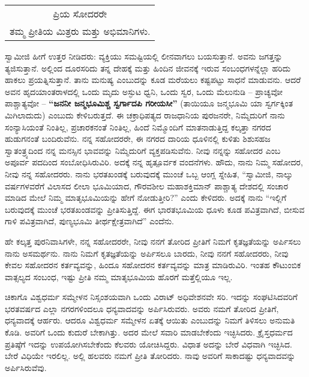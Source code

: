 \begin{longtable}[r]{@{}c@{}}
ಪ್ರಿಯ ಸೋದರರೇ \\
ತಮ್ಮ ಪ್ರೀತಿಯ ಮಿತ್ರರು ಮತ್ತು ಅಭಿಮಾನಿಗಳು. \\
\end{longtable}

\vskip 0.2cm

ಸ್ವಾಮೀಜಿ ಹೀಗೆ ಉತ್ತರ ನೀಡಿದರು: ವ್ಯಕ್ತಿಯು ಸಮಷ್ಟಿಯಲ್ಲಿ ಲೀನವಾಗಲು ಬಯಸುತ್ತಾನೆ. ಅವನು ಜಗತ್ತನ್ನು ತ್ಯಜಿಸುತ್ತಾನೆ. ಅಲ್ಲಿಂದ ದೂರಸರಿದು ತನ್ನ ದೇಹಕ್ಕೆ ಮತ್ತು ಹಿಂದಿನ ಜೀವನಕ್ಕೆ ಇರುವ ಸಂಬಂಧಗಳನ್ನೆಲ್ಲಾ ಹರಿದು ಹಾಕಲು ಪ್ರಯತ್ನಿಸುತ್ತಾನೆ. ತಾನು ಮನುಷ್ಯ ಎಂಬುದನ್ನು ಕೂಡ ಮರೆಯಲು ಕಷ್ಟಪಟ್ಟು ಸಾಧನೆ ಮಾಡುವನು. ಆದರೆ ಅವನ ಹೃದಯಾಂತರಾಳದಲ್ಲಿ ಒಂದು ಮೃದು ಅಸ್ಫುಟ ಧ್ವನಿ, ಒಂದು ಸ್ವರ, ಒಂದು ಮೆಲುನುಡಿ – ಪ್ರಾಚ್ಯವೋ ಪಾಶ್ಚಾತ್ಯವೋ – \textbf{“ಜನನೀ ಜನ್ಮಭೂಮಿಶ್ಚ ಸ್ವರ್ಗಾದಪಿ ಗರೀಯಸೀ”} (ತಾಯಿಯೂ ಜನ್ಮಭೂಮಿ ಯಾ ಸ್ವರ್ಗಕ್ಕಿಂತ ಮಿಗಿಲಾದುದು) ಎಂಬುದು ಕೇಳಿಬರುತ್ತದೆ. ಈ ಚಕ್ರಾಧಿಪತ್ಯದ ರಾಜಧಾನಿಯ ಪುರಜನರೇ, ನಿಮ್ಮೆದುರಿಗೆ ನಾನು ಸಂನ್ಯಾಸಿಯಂತೆ ನಿಂತಿಲ್ಲ, ಪ್ರಚಾರಕನಂತೆ ನಿಂತಿಲ್ಲ, ಹಿಂದೆ ನಿಮ್ಮೊಂದಿಗೆ ಮಾತನಾಡುತ್ತಿದ್ದ ಕಲ್ಕತ್ತಾ ನಗರದ ಹುಡುಗನಂತೆ ಬಂದಿರುವೆನು. ನನ್ನ ಸಹೋದರರೇ, ಈ ನಗರದ ದಾರಿಯ ಧೂಳಿನಲ್ಲಿ ಕುಳಿತು ಶಿಶುಸಹಜ ಸ್ವಾತಂತ್ರ್ಯದಿಂದ ನನ್ನ ಮನಸ್ಸಿನ ಭಾವವನ್ನು ನಿಮ್ಮೆದುರಿಗೆ ವ್ಯಕ್ತಪಡಿಸುವೆನು. ನೀವು ನನ್ನನ್ನು ಸಹೋದರ ಎಂಬ ಅಪೂರ್ವ ಪದದಿಂದ ಸಂಬೋಧಿಸಿರುವಿರಿ. ಅದಕ್ಕೆ ನನ್ನ ಹೃತ್ಪೂರ್ವಕ ವಂದನೆಗಳು. ಹೌದು, ನಾನು ನಿಮ್ಮ ಸಹೋದರ, ನೀವು ನನ್ನ ಸಹೋದರರು. ನಾನು ಭರತಖಂಡಕ್ಕೆ ಬರುವುದಕ್ಕೆ ಮುಂಚೆ ಒಬ್ಬ ಆಂಗ್ಲ ಸ್ನೇಹಿತ, “ಸ್ವಾಮೀಜಿ, ನಾಲ್ಕು ವರ್ಷಗಳವರೆಗೆ ವಿಲಾಸದ ಲೀಲಾ ಭೂಮಿಯಾದ, ಗೌರವಶೀಲ ಮಹಾಶಕ್ತಿಮಾನ್​ ಪಾಶ್ಚಾತ್ಯ ದೇಶದಲ್ಲಿ ಸಂಚಾರ ಮಾಡಿದ ಮೇಲೆ ನಿಮ್ಮ ಮಾತೃಭೂಮಿಯನ್ನು ಹೇಗೆ ನೋಡುತ್ತೀರಿ?” ಎಂದು ಕೇಳಿದರು. ಅದಕ್ಕೆ ನಾನು “ಇಲ್ಲಿಗೆ ಬರುವುದಕ್ಕೆ ಮುಂಚೆ ಭರತಖಂಡವನ್ನು ಪ್ರೀತಿಸುತ್ತಿದ್ದೆ. ಈಗ ಭಾರತಭೂಮಿಯ ಧೂಳು ಕೂಡ ಪವಿತ್ರವಾಗಿದೆ, ಬೀಸುವ ಗಾಳಿ ಪವಿತ್ರವಾಗಿದೆ, ಪುಣ್ಯಭೂಮಿ ತೀರ್ಥಕ್ಷೇತ್ರವಾಗಿದೆ” ಎಂದೆನು.

ಹೇ ಕಲ್ಕತ್ತ ಪುರನಿವಾಸಿಗಳೇ, ನನ್ನ ಸಹೋದರರೇ, ನೀವು ನನಗೆ ತೋರಿದ ಪ್ರೀತಿಗೆ ನಿಮಗೆ ಕೃತಜ್ಞತೆಯನ್ನು ಅರ್ಪಿಸಲು ನಾನು ಅಸಮರ್ಥನು. ನಾನು ನಿಮಗೆ ಕೃತಜ್ಞತೆಯನ್ನು ಅರ್ಪಿಸಲೂ ಬಾರದು, ನೀವು ನನಗೆ ಸಹೋದರರು, ನೀವು ಕೇವಲ ಸಹೋದರನ ಕರ್ತವ್ಯವನ್ನು, ಹಿಂದೂ ಸಹೋದರನ ಕರ್ತವ್ಯವನ್ನು ಮಾತ್ರ ಮಾಡಿರುವಿರಿ. ಇಂತಹ ಕೌಟುಂಬಿಕ ವಾತ್ಸಲ್ಯದ ಸಂಬಂಧ, ಇಷ್ಟು ಪ್ರೀತಿ ನಮ್ಮ ಮಾತೃಭೂಮಿಯ ಹೊರಗೆ ಮತ್ತೆಲ್ಲಿಯೂ ಇಲ್ಲ.

ಚಿಕಾಗೊ ವಿಶ್ವಧರ್ಮ ಸಮ್ಮೇಳನ ನಿಸ್ಸಂಶಯವಾಗಿ ಒಂದು ವಿರಾಟ್​ ಅಧಿವೇಶನವೇ ಸರಿ. ಇದನ್ನು ಸಂಘಟಿಸಿದವರಿಗೆ ಭರತವರ್ಷದ ಎಲ್ಲಾ ನಗರಗಳಿಂದಲೂ ಧನ್ಯವಾದವನ್ನು ಅರ್ಪಿಸಿರುವರು. ಅವರು ನಮಗೆ ತೋರಿದ ಪ್ರೀತಿಗೆ, ಧನ್ಯವಾದಕ್ಕೆ ಆರ್ಹರು. ಆದರೂ ವಿಶ್ವಧರ್ಮ ಸಮ್ಮೇಳನ ಏತಕ್ಕೆ ಆಯಿತು ಎಂಬುದನ್ನು ನಿಮಗೆ ತಿಳಿಸಲು ಅನುಮತಿ ಕೊಡಿ. ಅವರಿಗೆ ಒಂದು ಕುದುರೆ ಬೇಕಾಗಿತ್ತು. ಅದರ ಮೇಲೆ ಸವಾರಿ ಮಾಡಬೇಕೆಂದು ಇಚ್ಛಿಸಿದರು. ಕ್ರೈಸ್ತಧರ್ಮದ ಪ್ರತಿಷ್ಠೆಗೆ ಇದನ್ನು ಉಪಯೋಗಿಸಬೇಕೆಂದು ಕೆಲವರು ಯೋಚಿಸಿದ್ದರು. ವಿಧಾತ ಅದನ್ನು ಬೇರೆ ವಿಧವಾಗಿ ಇಚ್ಛಿಸಿದ. ಬೇರೆ ವಿಧಿಯೇ ಇರಲಿಲ್ಲ. ಅಲ್ಲಿ ಹಲವರು ನಮಗೆ ಪ್ರೀತಿ ತೋರಿದರು. ನಾವು ಅವರಿಗೆ ಸಾಕಾದಷ್ಟು ಧನ್ಯವಾದವನ್ನು ಅರ್ಪಿಸಿರುವೆವು.

